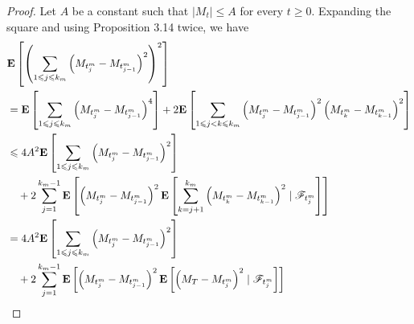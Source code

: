 \begin{proof}
		Let $A$ be a constant such that $\left|M_t\right| \leq A$ for every $t \geq 0$. Expanding the square and using Proposition 3.14 twice, we have
		$$
		\begin{aligned}
			& {\mathbf E}\left[\left(\sum_{1 \leqslant j \leqslant k_m}\left(M_{t_j^m}-M_{t_{j-1}^m}\right)^2\right)^2\right] \\
			& ={\mathbf E}\left[\sum_{1 \leqslant j \leqslant k_m}\left(M_{t_j^m}-M_{t_{j-1}^m}\right)^4\right]+2 {\mathbf E}\left[\sum_{1 \leqslant j<k \leqslant k_m}\left(M_{t_j^m}-M_{t_{j-1}^m}\right)^2\left(M_{t_k^m}-M_{t_{k-1}^m}\right)^2\right] \\
			& \leqslant 4 A^2 {\mathbf E}\left[\sum_{1 \leqslant j \leqslant k_m}\left(M_{t_j^m}-M_{t_{j-1}^m}\right)^2\right] \\
			& \quad+2 \sum_{j=1}^{k_m-1} {\mathbf E}\left[\left(M_{t_j^m}-M_{t_{j-1}^m}\right)^2 {\mathbf E}\left[\sum_{k=j+1}^{k_m}\left(M_{t_k^m}-M_{t_{k-1}^m}\right)^2 \mid \mathscr{F}_{t_j^m}\right]\right] \\
			& =4 A^2 {\mathbf E}\left[\sum_{1 \leqslant j \leqslant k_m}\left(M_{t_j^m}-M_{t_{j-1}^m}\right)^2\right] \\
			& \quad+2 \sum_{j=1}^{k_m-1} {\mathbf E}\left[\left(M_{t_j^m}-M_{t_{j-1}^m}\right)^2 {\mathbf E}\left[\left(M_T-M_{t_j^m}\right)^2 \mid \mathscr{F}_{t_j^m}\right]\right]
		\end{aligned}
		$$
	\end{proof}
		
